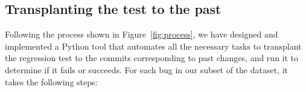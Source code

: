 


\subsection{Transplanting the test to the past}
\label{subsec:transplant} 

Following the process shown in Figure~\ref{fig:process}, we have designed and implemented a Python tool that automates all the necessary tasks to transplant the regression test to the commits corresponding to past changes, and run it to determine if it fails or succeeds. 
For each bug in our subset of the dataset, it takes the following steps:

